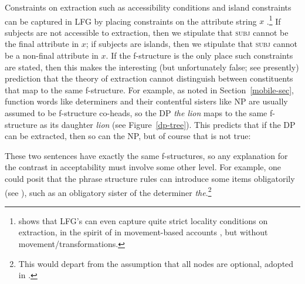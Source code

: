 \begin{sloppypar} 
Constraints on extraction such as accessibility conditions and island constraints  can be captured in LFG by placing constraints on the attribute string \ensuremath{x} \citep[Chapter~17]{dalrymple;ea19}.\footnote{\citet{asudeh-lpr} shows that LFG's  \citep[225--230]{dalrymple;ea19} can even capture quite strict locality conditions on extraction, in the spirit of  in movement-based accounts \citep{Chomsky73a,Chomsky77a-u}, but without movement/transformations.} If subjects are not accessible to extraction, then we stipulate that \textsc{subj} cannot be the final attribute in \ensuremath{x}; if subjects are islands, then we stipulate that \textsc{subj} cannot be a non-final attribute in \ensuremath{x}.  If the f-structure is the only place such constraints are stated, then 
this makes the interesting (but unfortunately false; see presently) prediction that the theory of extraction cannot distinguish between constituents that map to the same f-structure.  For example, as noted in Section~\ref{mobile-sec}, function words like determiners and their contentful sisters like NP are usually assumed to be f-structure co-heads, so the DP \textit{the lion} maps to the same f-structure as its daughter \textit{lion} (see  Figure~\ref{dp-tree}).  This predicts that if the DP can be extracted, then so can the NP, but of course that is not true:
\end{sloppypar}

\begin{exe} 
\ex	\label{nope}
\begin{xlist}
\end{xlist}
\end{exe}
These two sentences have exactly the same f-structures, so any explanation for the contrast in acceptability must involve some other level.  For example, one could posit that the phrase structure rules can introduce some items obligatorily (see \citealt[239]{snijders15}), such as an obligatory sister of the determiner \textit{the}.\footnote{This would depart from the assumption that all nodes are optional, adopted in \citet{BATW2016a}.} 


